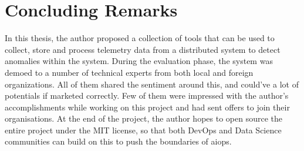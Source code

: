 \section{Concluding Remarks}

In this thesis, the author proposed a collection of tools that can be used to collect, store and process telemetry data from a distributed system to detect anomalies within the system. During the evaluation phase, the system was demoed to a number of technical experts from both local and foreign organizations. All of them shared the sentiment around this, and could've a lot of potentials if marketed correctly. Few of them were impressed with the author's accomplishments while working on this project and had sent offers to join their organisations. At the end of the project, the author hopes to open source the entire project under the MIT license, so that both DevOps and Data Science communities can build on this to push the boundaries of \ac{aiops}.